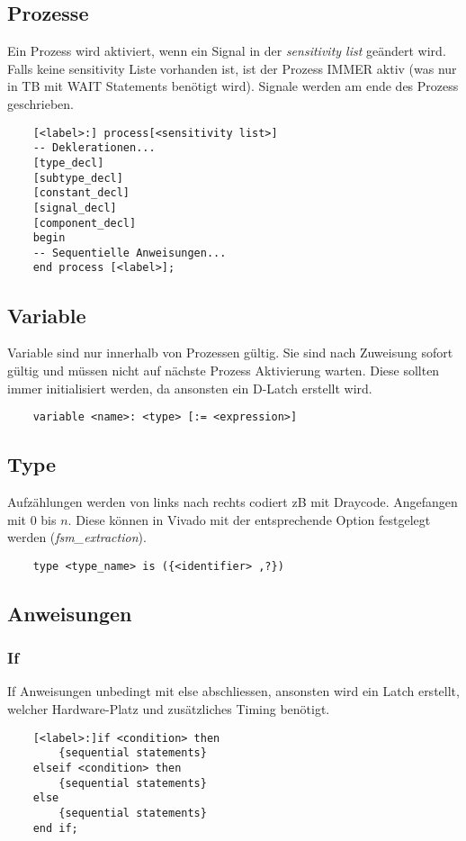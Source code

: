 \subsection{Prozesse}
Ein Prozess wird aktiviert, wenn ein Signal in der \textit{sensitivity list} geändert wird. Falls keine sensitivity Liste vorhanden ist, ist der Prozess IMMER aktiv (was nur in TB mit WAIT Statements benötigt wird). Signale werden am ende des Prozess geschrieben. 
\begin{lstlisting}
	[<label>:] process[<sensitivity list>]
	-- Deklerationen...
	[type_decl]
	[subtype_decl]
	[constant_decl]
	[signal_decl]
	[component_decl]
	begin
	-- Sequentielle Anweisungen...
	end process [<label>];
\end{lstlisting}

\subsection{Variable}
Variable sind nur innerhalb von Prozessen gültig. Sie sind nach Zuweisung sofort gültig und müssen nicht auf nächste Prozess Aktivierung warten. Diese sollten immer initialisiert werden, da ansonsten ein D-Latch erstellt wird.
\begin{lstlisting}
	variable <name>: <type> [:= <expression>]
\end{lstlisting}

\subsection{Type}
Aufzählungen werden von links nach rechts codiert zB mit Draycode. Angefangen mit $0$ bis $n$. Diese können in Vivado mit der entsprechende Option festgelegt werden (\textit{fsm\_extraction}).
\begin{lstlisting}
	type <type_name> is ({<identifier> ,?})
\end{lstlisting}

\subsection{Anweisungen}
\subsubsection{If}
If Anweisungen unbedingt mit else abschliessen, ansonsten wird ein Latch erstellt, welcher Hardware-Platz und zusätzliches Timing benötigt.
\begin{lstlisting}
	[<label>:]if <condition> then
		{sequential statements}
	elseif <condition> then
	 	{sequential statements}
 	else
 		{sequential statements}
	end if;
\end{lstlisting}

